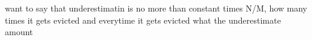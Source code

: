 



want to say that underestimatin is no more than constant times N/M, how many times it gets evicted and everytime it gets evicted what the underestimate amount

